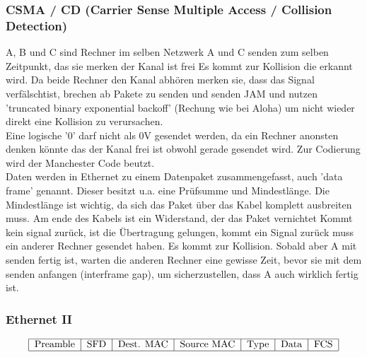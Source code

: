 \documentclass[a4paper,10pt]{scrartcl}
\begin{document}
        \subsubsection{CSMA / CD (Carrier Sense Multiple Access / Collision Detection)}
            A, B und C sind Rechner im selben Netzwerk
            A und C senden zum selben Zeitpunkt, das sie merken der Kanal ist frei
            Es kommt zur Kollision die erkannt wird. Da beide Rechner den Kanal abhören merken sie,
            dass das Signal verfälschtist, brechen ab Pakete zu senden und senden JAM  und nutzen 'truncated binary exponential backoff' (Rechung wie bei Aloha) um
            nicht wieder direkt eine Kollision zu verursachen. \\
            Eine logische '0' darf nicht als 0V gesendet werden, da ein Rechner anonsten denken könnte das der Kanal frei ist obwohl gerade gesendet wird. Zur Codierung wird
            der Manchester Code beutzt. \\
            Daten werden in Ethernet zu einem Datenpaket zusammengefasst, auch 'data frame' genannt. Dieser besitzt u.a. eine Prüfsumme und Mindestlänge.
            Die Mindestlänge ist wichtig, da sich das Paket über das Kabel komplett ausbreiten muss. Am ende des Kabels ist ein Widerstand, der das Paket vernichtet
            Kommt kein signal zurück, ist die Übertragung gelungen, kommt ein Signal zurück muss ein anderer Rechner gesendet haben. Es kommt zur Kollision.
            Sobald aber A mit senden fertig ist, warten die anderen Rechner eine gewisse Zeit, bevor sie mit dem senden anfangen (interframe gap), um sicherzustellen, dass
            A auch wirklich fertig ist. 
        \subsubsection{Ethernet II}
            \[
                \begin{tabular}{|c|c|c|c|c|c|c|}
                    \hline
                        Preamble & SFD & Dest. MAC & Source MAC & Type & Data & FCS \\
                    \hline
                \end{tabular}
            \]
\end{document}
